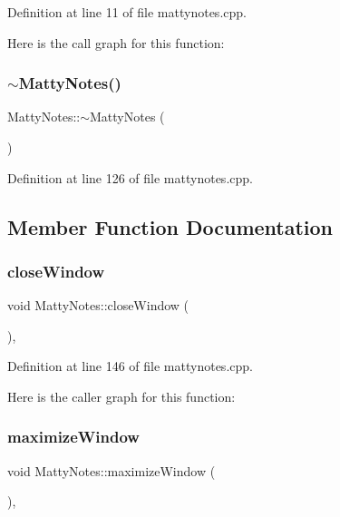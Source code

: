 Definition at line 11 of file mattynotes.\+cpp.

Here is the call graph for this function\+:
\hypertarget{classMattyNotes_aff7466ee8047ed0293c62df37d245906}{}\label{classMattyNotes_aff7466ee8047ed0293c62df37d245906} 
\subsubsection{\texorpdfstring{$\sim$\+Matty\+Notes()}{~MattyNotes()}}
{\footnotesize\ttfamily Matty\+Notes\+::$\sim$\+Matty\+Notes (\begin{DoxyParamCaption}{ }\end{DoxyParamCaption})}



Definition at line 126 of file mattynotes.\+cpp.



\subsection{Member Function Documentation}
\hypertarget{classMattyNotes_a63c0d10781a0acc57387682282aded37}{}\label{classMattyNotes_a63c0d10781a0acc57387682282aded37} 
\subsubsection{\texorpdfstring{close\+Window}{closeWindow}}
{\footnotesize\ttfamily void Matty\+Notes\+::close\+Window (\begin{DoxyParamCaption}{ }\end{DoxyParamCaption})\hspace{0.3cm}{\ttfamily [private]}, {\ttfamily [slot]}}



Definition at line 146 of file mattynotes.\+cpp.

Here is the caller graph for this function\+:
\hypertarget{classMattyNotes_a49cfcd1087c5f3c0c9f5ced2b7675e6f}{}\label{classMattyNotes_a49cfcd1087c5f3c0c9f5ced2b7675e6f} 
\subsubsection{\texorpdfstring{maximize\+Window}{maximizeWindow}}
{\footnotesize\ttfamily void Matty\+Notes\+::maximize\+Window (\begin{DoxyParamCaption}{ }\end{DoxyParamCaption})\hspace{0.3cm}{\ttfamily [private]}, {\ttfamily [slot]}}



